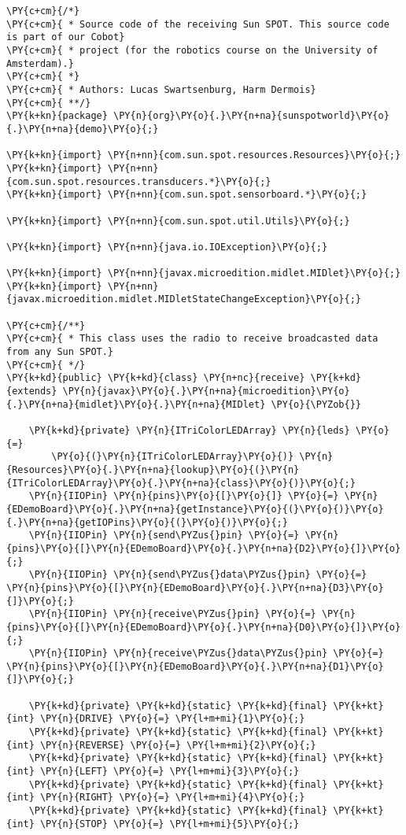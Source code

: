 \begin{Verbatim}[commandchars=\\\{\}]
\PY{c+cm}{/*}
\PY{c+cm}{ * Source code of the receiving Sun SPOT. This source code is part of our Cobot}
\PY{c+cm}{ * project (for the robotics course on the University of Amsterdam).}
\PY{c+cm}{ *}
\PY{c+cm}{ * Authors: Lucas Swartsenburg, Harm Dermois}
\PY{c+cm}{ **/}
\PY{k+kn}{package} \PY{n}{org}\PY{o}{.}\PY{n+na}{sunspotworld}\PY{o}{.}\PY{n+na}{demo}\PY{o}{;}

\PY{k+kn}{import} \PY{n+nn}{com.sun.spot.resources.Resources}\PY{o}{;}
\PY{k+kn}{import} \PY{n+nn}{com.sun.spot.resources.transducers.*}\PY{o}{;}
\PY{k+kn}{import} \PY{n+nn}{com.sun.spot.sensorboard.*}\PY{o}{;}

\PY{k+kn}{import} \PY{n+nn}{com.sun.spot.util.Utils}\PY{o}{;}

\PY{k+kn}{import} \PY{n+nn}{java.io.IOException}\PY{o}{;}

\PY{k+kn}{import} \PY{n+nn}{javax.microedition.midlet.MIDlet}\PY{o}{;}
\PY{k+kn}{import} \PY{n+nn}{javax.microedition.midlet.MIDletStateChangeException}\PY{o}{;}

\PY{c+cm}{/**}
\PY{c+cm}{ * This class uses the radio to receive broadcasted data from any Sun SPOT.}
\PY{c+cm}{ */}
\PY{k+kd}{public} \PY{k+kd}{class} \PY{n+nc}{receive} \PY{k+kd}{extends} \PY{n}{javax}\PY{o}{.}\PY{n+na}{microedition}\PY{o}{.}\PY{n+na}{midlet}\PY{o}{.}\PY{n+na}{MIDlet} \PY{o}{\PYZob{}}

    \PY{k+kd}{private} \PY{n}{ITriColorLEDArray} \PY{n}{leds} \PY{o}{=}
        \PY{o}{(}\PY{n}{ITriColorLEDArray}\PY{o}{)} \PY{n}{Resources}\PY{o}{.}\PY{n+na}{lookup}\PY{o}{(}\PY{n}{ITriColorLEDArray}\PY{o}{.}\PY{n+na}{class}\PY{o}{)}\PY{o}{;}
    \PY{n}{IIOPin} \PY{n}{pins}\PY{o}{[}\PY{o}{]} \PY{o}{=} \PY{n}{EDemoBoard}\PY{o}{.}\PY{n+na}{getInstance}\PY{o}{(}\PY{o}{)}\PY{o}{.}\PY{n+na}{getIOPins}\PY{o}{(}\PY{o}{)}\PY{o}{;}
    \PY{n}{IIOPin} \PY{n}{send\PYZus{}pin} \PY{o}{=} \PY{n}{pins}\PY{o}{[}\PY{n}{EDemoBoard}\PY{o}{.}\PY{n+na}{D2}\PY{o}{]}\PY{o}{;}
    \PY{n}{IIOPin} \PY{n}{send\PYZus{}data\PYZus{}pin} \PY{o}{=} \PY{n}{pins}\PY{o}{[}\PY{n}{EDemoBoard}\PY{o}{.}\PY{n+na}{D3}\PY{o}{]}\PY{o}{;}
    \PY{n}{IIOPin} \PY{n}{receive\PYZus{}pin} \PY{o}{=} \PY{n}{pins}\PY{o}{[}\PY{n}{EDemoBoard}\PY{o}{.}\PY{n+na}{D0}\PY{o}{]}\PY{o}{;}
    \PY{n}{IIOPin} \PY{n}{receive\PYZus{}data\PYZus{}pin} \PY{o}{=} \PY{n}{pins}\PY{o}{[}\PY{n}{EDemoBoard}\PY{o}{.}\PY{n+na}{D1}\PY{o}{]}\PY{o}{;}

    \PY{k+kd}{private} \PY{k+kd}{static} \PY{k+kd}{final} \PY{k+kt}{int} \PY{n}{DRIVE} \PY{o}{=} \PY{l+m+mi}{1}\PY{o}{;}
    \PY{k+kd}{private} \PY{k+kd}{static} \PY{k+kd}{final} \PY{k+kt}{int} \PY{n}{REVERSE} \PY{o}{=} \PY{l+m+mi}{2}\PY{o}{;}
    \PY{k+kd}{private} \PY{k+kd}{static} \PY{k+kd}{final} \PY{k+kt}{int} \PY{n}{LEFT} \PY{o}{=} \PY{l+m+mi}{3}\PY{o}{;}
    \PY{k+kd}{private} \PY{k+kd}{static} \PY{k+kd}{final} \PY{k+kt}{int} \PY{n}{RIGHT} \PY{o}{=} \PY{l+m+mi}{4}\PY{o}{;}
    \PY{k+kd}{private} \PY{k+kd}{static} \PY{k+kd}{final} \PY{k+kt}{int} \PY{n}{STOP} \PY{o}{=} \PY{l+m+mi}{5}\PY{o}{;}


\end{Verbatim}
